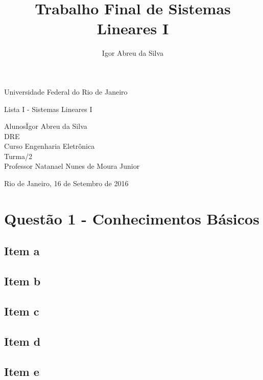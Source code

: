 \documentclass[a4paper, 12pt]{article}
\author{Igor Abreu da Silva}
\title{Trabalho Final de Sistemas Lineares I}
\begin{document}
	
	\begin{titlepage}
		\begin{center}
			\huge{Universidade Federal do Rio de Janeiro}
			\vspace{95pt}
			
			\large{Lista I - Sistemas Lineares I}
			\vspace{160pt}
		\end{center}
		
		\begin{flushleft}
			\begin{tabbing}
				Alunos\qquad\qquad\= Igor Abreu da Silva\\
				DRE \\
				Curso\> Engenharia Eletrônica \\
				Turma/2 \\
				Professor\> Natanael Nunes de Moura Junior \\
				
			\end{tabbing}
			
		\end{flushleft}
		
		\begin{center}
			\vspace{\fill}
			Rio de Janeiro, 16 de Setembro de 2016
		\end{center}
	\end{titlepage}
	
	\newpage
	\tableofcontents
	\thispagestyle{empty}
	\newpage
	
	\section{Quest\~{a}o 1 - Conhecimentos Básicos}
		\subsection{Item a}	
		\subsection{Item b}	
		\subsection{Item c}	
		\subsection{Item d}	
		\subsection{Item e}	
\end{document}
